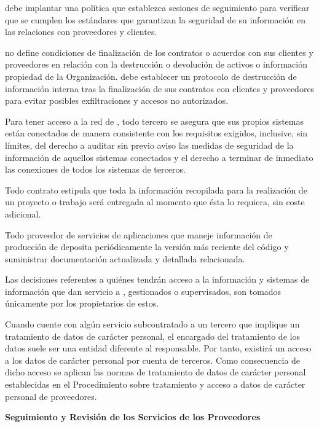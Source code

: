 \Beneficiario{} debe implantar una política que establezca sesiones de seguimiento para verificar que se cumplen los estándares que garantizan la seguridad de su información en las relaciones con proveedores y clientes.

\Beneficiario{} no define condiciones de finalización de los contratos o acuerdos con sus clientes y proveedores en relación con la destrucción o devolución de activos o información propiedad de la Organización. \Beneficiario{} debe establecer un protocolo de destrucción de información interna tras la finalización de sus contratos con clientes y proveedores para evitar posibles exfiltraciones y accesos no autorizados.

Para tener acceso a la red de \Beneficiario{}, todo tercero se asegura que sus propios sistemas están conectados de manera consistente con los requisitos exigidos, inclusive, sin límites, del derecho a auditar sin previo aviso las medidas de seguridad de la información de aquellos sistemas conectados y el derecho a terminar de inmediato las conexiones de todos los sistemas de terceros.

Todo contrato estipula que toda la información recopilada para la realización de un proyecto o trabajo será entregada al momento que ésta lo requiera, sin coste adicional.

Todo proveedor de servicios de aplicaciones que maneje información de producción de \Beneficiario{} deposita periódicamente la versión más reciente del código y suministrar documentación actualizada y detallada relacionada.

Las decisiones referentes a quiénes tendrán acceso a la información y sistemas de información que dan servicio a \Beneficiario{}, gestionados o supervisados, son tomados únicamente por los propietarios de estos.

Cuando \Beneficiario{} cuente con algún servicio subcontratado a un tercero que implique un tratamiento de datos de carácter personal, el encargado del tratamiento de los datos suele ser una entidad diferente al responsable. Por tanto, existirá un acceso a los datos de carácter personal por cuenta de terceros. Como consecuencia de dicho acceso se aplican las normas de tratamiento de datos de carácter personal establecidas en el Procedimiento sobre tratamiento y acceso a datos de carácter personal de proveedores.

\textbf{Seguimiento y Revisión de los Servicios de los Proveedores}

